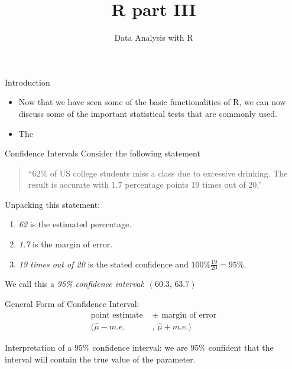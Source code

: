 \documentclass[xcolor=svgnames, 10pt, handout]{beamer}
\title
  [R]
  {R part III}
\subtitle{Data Analysis with R}
\begin{document}
\maketitle



\begin{frame}{Introduction}
\begin{itemize}
\item Now that we have seen some of the basic functionalities of R, we can now discuss some of the important statistical tests that are commonly used. 
\item The 
\end{itemize}

\end{frame}


\begin{frame}[fragile]{Confidence Intervals}
Consider the following statement
\begin{quotation}
``62\% of US college students miss a class due to excessive drinking.  The result is accurate with 1.7 percentage points 19 times out of 20.''
\end{quotation}
\vfill
Unpacking this statement:
\begin{enumerate}
\item \emph{62} is the estimated percentage.
\item \emph{1.7} is the margin of error.
\item \emph{19 times out of 20} is the stated confidence and $100\% \frac{19}{20} = 95\%$.
\end{enumerate}
\vfill
We call this a \emph{95\% confidence interval}: $(60.3,\, 63.7)$
\vfill
\end{frame}


\begin{frame}[fragile]
\vfill
\begin{block}{General Form of Confidence Interval:}
\begin{align*}
\text{point estimate }&\pm \text{ margin of error}\\
(\hat\mu-m.e.&,\, \hat\mu+m.e.)
\end{align*}
\end{block}
\vfill
Interpretation of a 95\% confidence interval: we are 95\% confident that the interval will contain the true value of the parameter.
\vfill
\end{frame}
\end{document}
